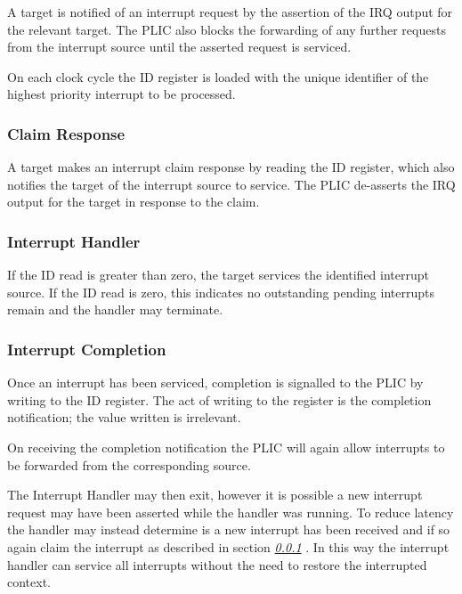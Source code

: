 A target is notified of an interrupt request by the assertion of the IRQ
output for the relevant target. The PLIC also blocks the forwarding of
any further requests from the interrupt source until the asserted
request is serviced.

On each clock cycle the ID register is loaded with the unique identifier
of the highest priority interrupt to be processed.

\subsubsection{Claim Response} \label{sec:claim-response}

A target makes an interrupt claim response by reading the ID register,
which also notifies the target of the interrupt source to service. The
PLIC de-asserts the IRQ output for the target in response to the claim.

\subsubsection{Interrupt Handler}

If the ID read is greater than zero, the target services the identified
interrupt source. If the ID read is zero, this indicates no outstanding
pending interrupts remain and the handler may terminate.

\subsubsection{Interrupt Completion}

Once an interrupt has been serviced, completion is signalled to the PLIC
by writing to the ID register. The act of writing to the register is the
completion notification; the value written is irrelevant.

On receiving the completion notification the PLIC will again allow
interrupts to be forwarded from the corresponding source.

The Interrupt Handler may then exit, however it is possible a new
interrupt request may have been asserted while the handler was running.
To reduce latency the handler may instead determine is a new interrupt
has been received and if so again claim the interrupt as described in
section \emph{\ref{sec:claim-response} }. In this
way the interrupt handler can service all interrupts without the need to
restore the interrupted context.
